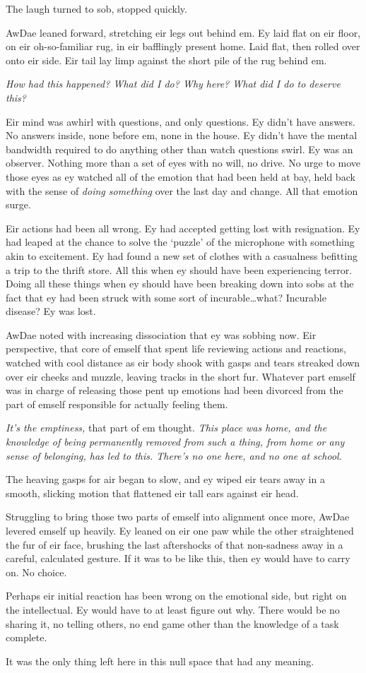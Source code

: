 The laugh turned to sob, stopped quickly.

AwDae leaned forward, stretching eir legs out behind em. Ey laid flat on eir floor, on eir oh-so-familiar rug, in eir bafflingly present home. Laid flat, then rolled over onto eir side. Eir tail lay limp against the short pile of the rug behind em.

\emph{How had this happened? What did I do? Why here? What did I do to deserve this?}

Eir mind was awhirl with questions, and only questions. Ey didn't have answers. No answers inside, none before em, none in the house. Ey didn't have the mental bandwidth required to do anything other than watch questions swirl. Ey was an observer. Nothing more than a set of eyes with no will, no drive. No urge to move those eyes as ey watched all of the emotion that had been held at bay, held back with the sense of \emph{doing something} over the last day and change. All that emotion surge.

Eir actions had been all wrong. Ey had accepted getting lost with resignation. Ey had leaped at the chance to solve the `puzzle' of the microphone with something akin to excitement. Ey had found a new set of clothes with a casualness befitting a trip to the thrift store. All this when ey should have been experiencing terror. Doing all these things when ey should have been breaking down into sobs at the fact that ey had been struck with some sort of incurable\ldots{}what? Incurable disease? Ey was lost.

AwDae noted with increasing dissociation that ey was sobbing now. Eir perspective, that core of emself that spent life reviewing actions and reactions, watched with cool distance as eir body shook with gasps and tears streaked down over eir cheeks and muzzle, leaving tracks in the short fur. Whatever part emself was in charge of releasing those pent up emotions had been divorced from the part of emself responsible for actually feeling them.

\emph{It's the emptiness,} that part of em thought. \emph{This place was home, and the knowledge of being permanently removed from such a thing, from home or any sense of belonging, has led to this. There's no one here, and no one at school.}

The heaving gasps for air began to slow, and ey wiped eir tears away in a smooth, slicking motion that flattened eir tall ears against eir head.

Struggling to bring those two parts of emself into alignment once more, AwDae levered emself up heavily. Ey leaned on eir one paw while the other straightened the fur of eir face, brushing the last aftershocks of that non-sadness away in a careful, calculated gesture. If it was to be like this, then ey would have to carry on. No choice.

Perhaps eir initial reaction has been wrong on the emotional side, but right on the intellectual. Ey would have to at least figure out why. There would be no sharing it, no telling others, no end game other than the knowledge of a task complete.

It was the only thing left here in this null space that had any meaning.
